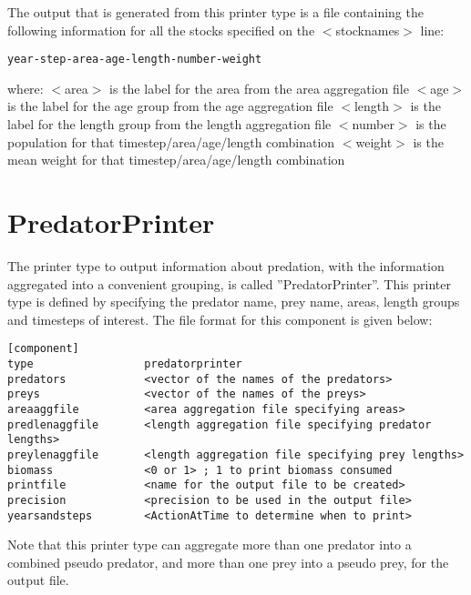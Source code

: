 \documentclass[10pt,twoside]{book}
\begin{document}
\bigskip
The output that is generated from this printer type is a file containing the following information for all the stocks specified on the $<$stocknames$>$ line:

{\small\begin{verbatim}
year-step-area-age-length-number-weight
\end{verbatim}}

where:\newline
$<$area$>$ is the label for the area from the area aggregation file\newline
$<$age$>$ is the label for the age group from the age aggregation file\newline
$<$length$>$ is the label for the length group from the length aggregation file\newline
$<$number$>$ is the population for that timestep/area/age/length combination\newline
$<$weight$>$ is the mean weight for that timestep/area/age/length combination

\section{PredatorPrinter}\label{sec:predatorprinter}
The printer type to output information about predation, with the information aggregated into a convenient grouping, is called ''PredatorPrinter''.  This printer type is defined by specifying the predator name, prey name, areas, length groups and timesteps of interest.  The file format for this component is given below:

{\small\begin{verbatim}
[component]
type                 predatorprinter
predators            <vector of the names of the predators>
preys                <vector of the names of the preys>
areaaggfile          <area aggregation file specifying areas>
predlenaggfile       <length aggregation file specifying predator lengths>
preylenaggfile       <length aggregation file specifying prey lengths>
biomass              <0 or 1> ; 1 to print biomass consumed
printfile            <name for the output file to be created>
precision            <precision to be used in the output file>
yearsandsteps        <ActionAtTime to determine when to print>
\end{verbatim}}

Note that this printer type can aggregate more than one predator into a combined pseudo predator, and more than one prey into a pseudo prey, for the output file.
\end{document}
